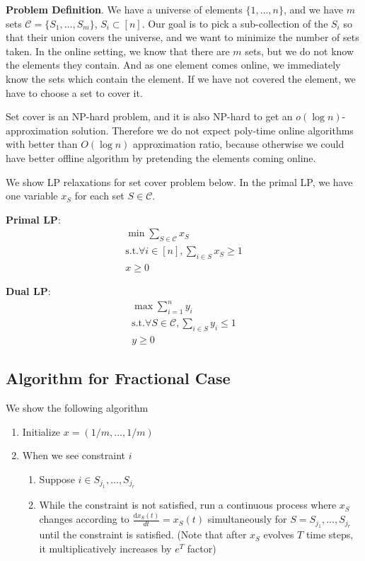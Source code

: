 \documentclass[11pt]{article}
\begin{document}
\textbf{Problem Definition}. We have a universe of elements $\{1, \ldots, n\}$, and we have $m$ sets $\mathcal{C}=\{S_1, \ldots, S_m\}$, $S_i\subset [n]$. Our goal is to pick a sub-collection of the $S_i$ so that their union covers the universe, and we want to minimize the number of sets taken. In the online setting, we know that there are $m$ sets, but we do not know the elements they contain. And as one element comes online, we immediately know the sets which contain the element. If we have not covered the element, we have to choose a set to cover it. 

Set cover is an NP-hard problem, and it is also NP-hard to get an $o(\log n)$-approximation solution. Therefore we do not expect poly-time online algorithms with better than $O(\log n)$ approximation ratio, because otherwise we could have better offline algorithm by pretending the elements coming online.  

We show LP relaxations for set cover problem below. In the primal LP, we have one variable $x_S$ for each set $S\in \mathcal{C}$. 

\textbf{Primal LP}:
\begin{equation}
\begin{split}
\min \sum_{S\in \mathcal{C}}{x_S} \\
\text{s.t.}\forall i\in [n], \sum_{i\in S}{x_S} \ge 1 \\
x \ge 0
\end{split}
\end{equation}

\textbf{Dual LP}:
\begin{equation}
\begin{split}
\max \sum_{i=1}^{n} {y_i} \\
\text{s.t.}\forall S\in \mathcal{C}, \sum_{i\in S}{y_i} \le 1 \\
y \ge 0
\end{split}
\end{equation}

\subsection{Algorithm for Fractional Case}
We show the following algorithm 

\begin{enumerate}
\item Initialize $x=(1/m, \ldots, 1/m)$

\item When we see constraint $i$
\begin{enumerate}
\item Suppose $i\in S_{j_1}, \ldots, S_{j_r}$
\item While the constraint is not satisfied, run a continuous process where $x_S$ changes according to $\frac{\mathrm{d}x_S(t)}{dt}=x_S(t)$ simultaneously for $S=S_{j_1}, \ldots, S_{j_r}$ until the constraint is satisfied. (Note that after $x_S$ evolves $T$ time steps, it multiplicatively increases by $e^T$ factor)
\end{enumerate}
\end{enumerate}
\end{document}
